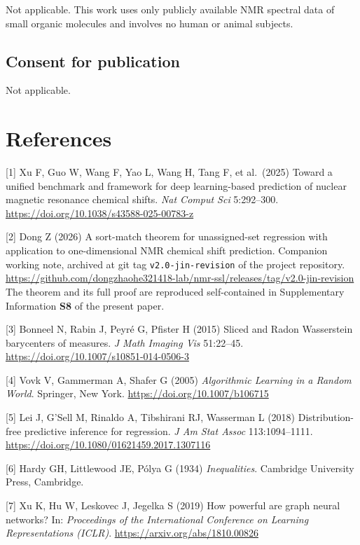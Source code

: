 \documentclass[
  11pt,
  a4paper,
]{article}
\begin{document}
Not applicable. This work uses only publicly available NMR spectral
data of small organic molecules and involves no human or animal
subjects.

\subsection*{Consent for publication}

Not applicable.

\section{References}\label{references}

\begingroup
\raggedright
\setlength{\parindent}{0pt}
\setlength{\parskip}{0.45em}
\sloppy

{[}1{]} Xu F, Guo W, Wang F, Yao L, Wang H, Tang F, et al.~(2025) Toward
a unified benchmark and framework for deep learning-based prediction
of nuclear magnetic resonance chemical shifts. \textit{Nat Comput Sci}
5:292--300. \url{https://doi.org/10.1038/s43588-025-00783-z}

{[}2{]} Dong Z (2026) A sort-match theorem for unassigned-set regression
with application to one-dimensional NMR chemical shift prediction.
Companion working note, archived at git tag \texttt{v2.0-jin-revision}
of the project repository.
\url{https://github.com/dongzhaohe321418-lab/nmr-ssl/releases/tag/v2.0-jin-revision}
The theorem and its full proof are reproduced self-contained in
Supplementary Information \textbf{S8} of the present paper.

{[}3{]} Bonneel N, Rabin J, Peyré G, Pfister H (2015) Sliced and Radon
Wasserstein barycenters of measures. \textit{J Math Imaging Vis}
51:22--45. \url{https://doi.org/10.1007/s10851-014-0506-3}

{[}4{]} Vovk V, Gammerman A, Shafer G (2005) \textit{Algorithmic Learning
in a Random World}. Springer, New York.
\url{https://doi.org/10.1007/b106715}

{[}5{]} Lei J, G'Sell M, Rinaldo A, Tibshirani RJ, Wasserman L (2018)
Distribution-free predictive inference for regression.
\textit{J Am Stat Assoc} 113:1094--1111.
\url{https://doi.org/10.1080/01621459.2017.1307116}

{[}6{]} Hardy GH, Littlewood JE, Pólya G (1934) \textit{Inequalities}.
Cambridge University Press, Cambridge.

{[}7{]} Xu K, Hu W, Leskovec J, Jegelka S (2019) How powerful are graph
neural networks? In: \textit{Proceedings of the International
Conference on Learning Representations (ICLR)}.
\url{https://arxiv.org/abs/1810.00826}
\end{document}
